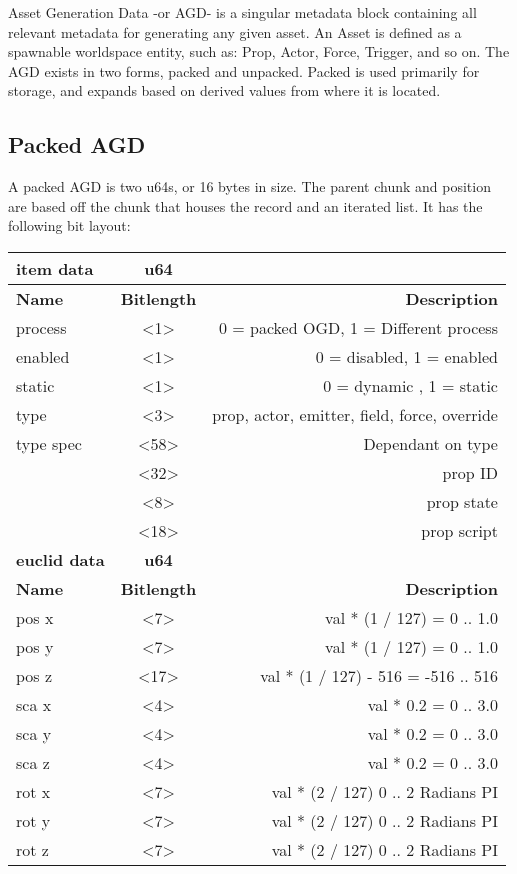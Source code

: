 Asset Generation Data -or AGD- is a singular metadata block containing all relevant metadata for generating any given asset. An Asset is defined as a spawnable worldspace entity, such as: Prop, Actor, Force, Trigger, and so on. The AGD exists in two forms, packed and unpacked. Packed is used primarily for storage, and expands based on derived values from where it is located. 

\subsection{Packed AGD}

A packed AGD is two u64s, or 16 bytes in size. The parent chunk and position are based off the chunk that houses the record and an iterated list. It has the following bit layout:

\begin{tabular}{|l|c|r|}  
    \hline
    \textbf{item data} & \textbf{u64} & \\
    \hline
    \textbf{Name} & \textbf{Bitlength} & \textbf{Description}\\ 
    process  & <1>     & 0 = packed OGD, 1 = Different process\\
    enabled  & <1>     & 0 = disabled, 1 = enabled\\
    static   & <1>     & 0 = dynamic , 1 = static\\
    type     & <3>     & prop, actor, emitter, field, force, override\\
    type spec  & <58>&Dependant on type\\
     & <32>&prop ID      \\
     & <8> &prop state   \\
    &  <18>&prop script  \\
    \hline
    \hline
    \textbf{euclid data} & \textbf{u64}&\\
    \hline
    \textbf{Name} & \textbf{Bitlength} & \textbf{Description}\\ 
    pos x & <7>  & val * (1 / 127) = 0 .. 1.0\\
    pos y & <7>  & val * (1 / 127) = 0 .. 1.0\\
    pos z & <17> & val * (1 / 127) - 516 = -516 .. 516\\
    sca x & <4>  & val * 0.2 = 0 .. 3.0\\
    sca y & <4>  & val * 0.2 = 0 .. 3.0\\
    sca z & <4>  & val * 0.2 = 0 .. 3.0\\
    rot x & <7>  & val * (2 / 127) 0 .. 2 Radians PI\\
    rot y & <7>  & val * (2 / 127) 0 .. 2 Radians PI\\
    rot z & <7>  & val * (2 / 127) 0 .. 2 Radians PI\\
    \hline
\end{tabular}

